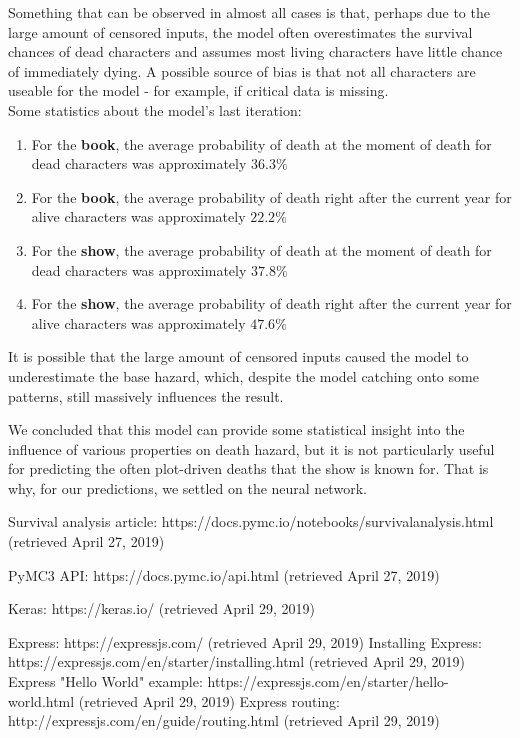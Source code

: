 \documentclass{bioinfo}
\begin{document}
Something that can be observed in almost all cases is that, perhaps due to the large amount of censored inputs, the model often overestimates the survival chances of dead characters and assumes most living characters have little chance of immediately dying. A possible source of bias is that not all characters are useable for the model - for example, if critical data is missing.\\
Some statistics about the model's last iteration:
\begin{enumerate}
    \item For the \textbf{book}, the average probability of death at the moment of death for dead characters was approximately $36.3\%$
    \item For the \textbf{book}, the average probability of death right after the current year for alive characters was approximately $22.2\%$
    \item For the \textbf{show}, the average probability of death at the moment of death for dead characters was approximately $37.8\%$
    \item For the \textbf{show}, the average probability of death right after the current year for alive characters was approximately $47.6\%$
\end{enumerate}
It is possible that the large amount of censored inputs caused the model to underestimate the base hazard, which, despite the model catching onto some patterns, still massively influences the result.

We concluded that this model can provide some statistical insight into the influence of various properties on death hazard, but it is not particularly useful for predicting the often plot-driven deaths that the show is known for. That is why, for our predictions, we settled on the neural network.




%
%
%
%
%
%
%
%
%


\begin{thebibliography}{}

  Survival analysis article: https://docs.pymc.io/notebooks/survival{\textunderscore}analysis.html (retrieved April 27, 2019)

 PyMC3 API: https://docs.pymc.io/api.html (retrieved April 27, 2019)

 Keras: https://keras.io/ (retrieved April 29, 2019)

 Express: https://expressjs.com/ (retrieved April 29, 2019)
 Installing Express: https://expressjs.com/en/starter/installing.html (retrieved April 29, 2019)
 Express "Hello World" example: https://expressjs.com/en/starter/hello-world.html (retrieved April 29, 2019)
 Express routing: http://expressjs.com/en/guide/routing.html (retrieved April 29, 2019)

\end{thebibliography}
\end{document}
